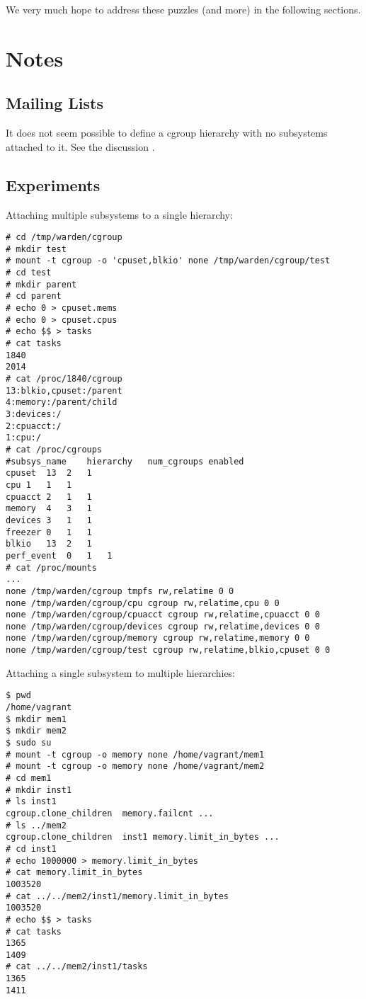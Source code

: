 \documentclass[a4paper,twoside,12pt]{article}
\begin{document}
We very much hope to address these puzzles (and more) in the following sections.

\section{Notes}

\subsection{Mailing Lists}

It does not seem possible to define a cgroup hierarchy with no subsystems attached to it.
See the discussion \cite{noop}.

\subsection{Experiments}

Attaching multiple subsystems to a single hierarchy:
\begin{verbatim}
# cd /tmp/warden/cgroup
# mkdir test
# mount -t cgroup -o 'cpuset,blkio' none /tmp/warden/cgroup/test
# cd test
# mkdir parent
# cd parent
# echo 0 > cpuset.mems 
# echo 0 > cpuset.cpus
# echo $$ > tasks
# cat tasks
1840
2014
# cat /proc/1840/cgroup
13:blkio,cpuset:/parent
4:memory:/parent/child
3:devices:/
2:cpuacct:/
1:cpu:/
# cat /proc/cgroups
#subsys_name	hierarchy	num_cgroups	enabled
cpuset	13	2	1
cpu	1	1	1
cpuacct	2	1	1
memory	4	3	1
devices	3	1	1
freezer	0	1	1
blkio	13	2	1
perf_event	0	1	1
# cat /proc/mounts 
...
none /tmp/warden/cgroup tmpfs rw,relatime 0 0
none /tmp/warden/cgroup/cpu cgroup rw,relatime,cpu 0 0
none /tmp/warden/cgroup/cpuacct cgroup rw,relatime,cpuacct 0 0
none /tmp/warden/cgroup/devices cgroup rw,relatime,devices 0 0
none /tmp/warden/cgroup/memory cgroup rw,relatime,memory 0 0
none /tmp/warden/cgroup/test cgroup rw,relatime,blkio,cpuset 0 0
\end{verbatim}

Attaching a single subsystem to multiple hierarchies:
\begin{verbatim}
$ pwd   
/home/vagrant
$ mkdir mem1
$ mkdir mem2
$ sudo su
# mount -t cgroup -o memory none /home/vagrant/mem1
# mount -t cgroup -o memory none /home/vagrant/mem2
# cd mem1
# mkdir inst1  
# ls inst1 
cgroup.clone_children  memory.failcnt ...
# ls ../mem2
cgroup.clone_children  inst1 memory.limit_in_bytes ...
# cd inst1
# echo 1000000 > memory.limit_in_bytes 
# cat memory.limit_in_bytes 
1003520
# cat ../../mem2/inst1/memory.limit_in_bytes 
1003520
# echo $$ > tasks
# cat tasks
1365
1409
# cat ../../mem2/inst1/tasks
1365
1411
\end{verbatim}
\end{document}
